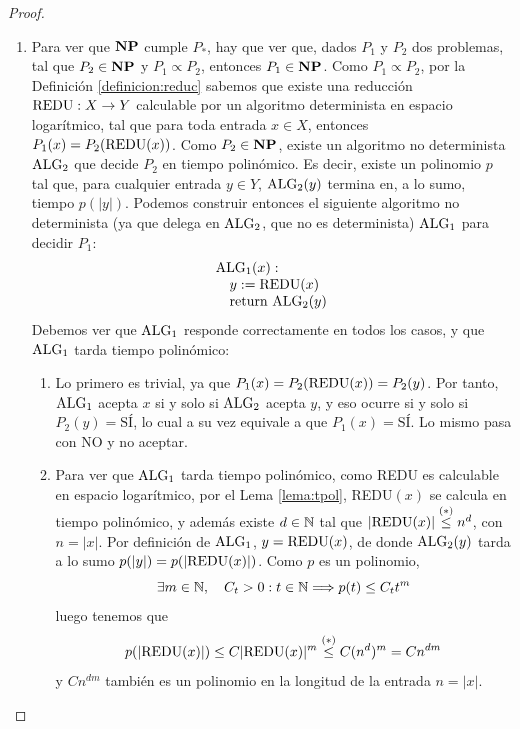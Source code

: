 \begin{ejercicio}
    \begin{proof}~
        \begin{enumerate}
            \item Para ver que $\textbf{NP}$ cumple $P_{*}$, hay que ver que, dados $P_1$ y $P_2$ dos problemas, tal que 
            $P_2 \in \textbf{NP}$ y $P_1 \propto P_2$, entonces $P_1 \in \textbf{NP}$. Como $P_1 \propto P_2$, por la Definición
            \ref{definicion:reduc} sabemos que existe una reducción $\text{REDU} : X \to Y$ calculable por un algoritmo
            determinista en espacio logarítmico, tal que para toda entrada $x \in X$, entonces
            $P_1(x) = P_2(\text{REDU}(x))$. Como $P_2 \in \textbf{NP}$, existe un algoritmo no determinista $\text{ALG}_2$ que 
            decide $P_2$ en tiempo polinómico. Es decir, existe un polinomio $p$ tal que, para cualquier entrada
            $y \in Y$, $\text{ALG}_2(y)$ termina en, a lo sumo, tiempo $p(|y|)$. Podemos construir entonces el siguiente
            algoritmo no determinista (ya que delega en $\text{ALG}_2$, que no es determinista) $\text{ALG}_1$ para 
            decidir $P_1$:
            $$
            \begin{array}{l}
            \text{ALG}_1(x):\\
            \quad y := \text{REDU}(x)\\
            \quad \text{return } \text{ALG}_2(y)
            \end{array}
            $$
            Debemos ver que $\text{ALG}_1$ responde correctamente en todos los casos, y que $\text{ALG}_1$ tarda tiempo polinómico:
            \begin{enumerate}
                \item Lo primero es trivial, ya que $P_1(x) = P_2(\text{REDU}(x)) = P_2(y)$. Por tanto, $\text{ALG}_1$ acepta
                $x$ si y solo si $\text{ALG}_2$ acepta $y$, y eso ocurre si y solo si $P_2(y) = \text{SÍ}$, lo cual 
                a su vez equivale a que $P_1(x) = \text{SÍ}$. Lo mismo pasa con NO y no aceptar.
                \item Para ver que $\text{ALG}_1$ tarda tiempo polinómico, como REDU es calculable en espacio
                logarítmico, por el Lema \ref{lema:tpol}, REDU$(x)$ se calcula en tiempo polinómico, y además
                existe $d \in \mathbb{N}$ tal que $|\text{REDU}(x)| \stackrel{(*)}{\leq} n^d$, con $n = |x|$. Por definición de $\text{ALG}_1$, 
                $y = \text{REDU}(x)$, de donde $\text{ALG}_2(y)$ tarda a lo sumo $p(|y|) = p(|\text{REDU}(x)|)$. Como 
                $p$ es un polinomio, $$\exists m \in \mathbb{N}, \quad C_t > 0 : t \in \mathbb{N} 
                \Longrightarrow p(t) \leq C_t t^m$$ 
                luego tenemos que $$p(|\text{REDU}(x)|) \leq C |\text{REDU}(x)|^m \stackrel{(*)}{\leq} C(n^d)^m = C n^{dm}$$
                y $Cn^{dm}$ también es un polinomio en la longitud de la entrada $n = |x|$. \\


\end{enumerate}
\end{enumerate}
\end{proof}
\end{ejercicio}
